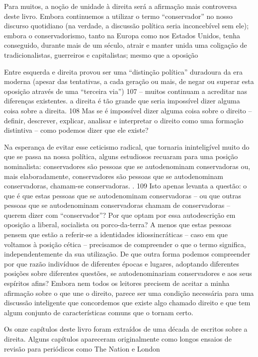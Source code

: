  \par 
Para muitos, a noção de unidade à direita será a afirmação mais controversa deste livro. Embora continuemos a utilizar o termo “conservador” no nosso discurso quotidiano (na verdade, a discussão política seria inconcebível sem ele); embora o conservadorismo, tanto na Europa como nos Estados Unidos, tenha conseguido, durante mais de um século, atrair e manter unida uma coligação de tradicionalistas, guerreiros e capitalistas; mesmo que a oposição
 \par 
Entre esquerda e direita provou ser uma “distinção política” duradoura da era moderna (apesar das tentativas, a cada geração ou mais, de negar ou superar esta oposição através de uma “terceira via”) {\color{blue}107} – muitos continuam a acreditar nas diferenças existentes. a direita é tão grande que seria impossível dizer alguma coisa sobre a direita. {\color{blue}108} Mas se é impossível dizer alguma coisa sobre o direito – definir, descrever, explicar, analisar e interpretar o direito como uma formação distintiva – como podemos dizer que ele existe?
 \par 
Na esperança de evitar esse ceticismo radical, que tornaria ininteligível muito do que se passa na nossa política, alguns estudiosos recuaram para uma posição nominalista: conservadores são pessoas que se autodenominam conservadoras ou, mais elaboradamente, conservadores são pessoas que se autodenominam conservadoras, chamam-se conservadoras. . {\color{blue}109} Isto apenas levanta a questão: o que é que estas pessoas que se autodenominam conservadoras – ou que outras pessoas que se autodenominam conservadoras chamam de conservadoras – querem dizer com “conservador”? Por que optam por essa autodescrição em oposição a liberal, socialista ou porco-da-terra? A menos que estas pessoas pensem que estão a referir-se a identidades idiossincráticas – caso em que voltamos à posição cética – precisamos de compreender o que o termo significa, independentemente da sua utilização. De que outra forma podemos compreender por que razão indivíduos de diferentes épocas e lugares, adoptando diferentes posições sobre diferentes questões, se autodenominariam conservadores e aos seus espíritos afins? Embora nem todos os leitores precisem de aceitar a minha afirmação sobre o que une o direito, parece ser uma condição necessária para uma discussão inteligente que concordemos que existe algo chamado direito e que tem algum conjunto de características comuns que o tornam certo.
 \par 
Os onze capítulos deste livro foram extraídos de uma década de escritos sobre a direita. Alguns capítulos apareceram originalmente como longos ensaios de revisão para periódicos como The Nation e London
